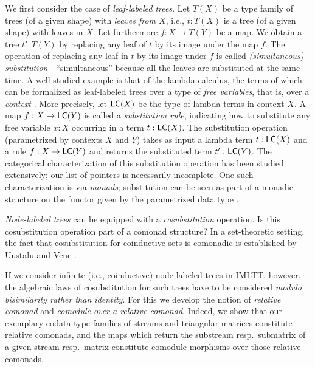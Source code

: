 \documentclass[a4paper,USenglish]{lipics}
\newcommand{\parencite}[1]{\cite{#1}}
\begin{document}
We first consider the  case of \emph{leaf-labeled trees}.
 Let $T(X)$ be a type family of trees (of a given shape) with \emph{leaves from $X$}, i.e., $t: T(X)$ is a tree (of a given shape) with leaves in $X$.
 Let furthermore $f : X \to T(Y)$ be a map. We obtain a tree $t' : T(Y)$ by replacing any leaf of $t$ by its image under the map $f$.
 The operation of replacing any leaf in $t$ by its image under $f$ is called \emph{(simultaneous) substitution}---\enquote{simultaneous} because all the leaves are 
 substituted at the same time. 
 A well-studied example is that of the lambda calculus, the terms of which can be formalized as leaf-labeled trees over a type of \emph{free variables}, that is,
 over a \emph{context} \parencite{alt_reus}.
 More precisely, let $\mathsf{LC}(X)$ be the type of lambda terms in context $X$. A map $f : X \to \mathsf{LC}(Y)$ is called a \emph{substitution rule}, indicating how to substitute any 
 free variable $x:X$ occurring in a term $t : \mathsf{LC}(X)$. 
 The substitution operation (parametrized by contexts $X$ and $Y$) takes as input a lambda term $t : \mathsf{LC}(X)$ and a rule $f : X \to \mathsf{LC}(Y)$ and returns the substituted term
 $t' : \mathsf{LC}(Y)$.
 The categorical characterization of this substitution operation
 has been studied extensively; our list of pointers \parencite{alt_reus, fpt, Power:2007:ASS:1230146.1230276, Tanaka:2005:UCF:1088454.1088457,
 DBLP:journals/iandc/HirschowitzM10, DBLP:conf/fossacs/AltenkirchCU10, ahrens_relmonads} is necessarily incomplete.
 One such characterization is via \emph{monads}; substitution can be seen as part of a monadic structure on the functor 
 given by the parametrized data type \parencite{alt_reus, 
 DBLP:journals/iandc/HirschowitzM10, DBLP:conf/fossacs/AltenkirchCU10, ahrens_relmonads}.
 
 
 \emph{Node-labeled trees} can be equipped with a \emph{cosubstitution} operation. 
 Is this cosubstitution operation part of a comonad structure?
 In a set-theoretic setting, the fact that cosubstitution for coinductive sets is comonadic is established by Uustalu and Vene \cite{DBLP:conf/sfp/UustaluV01}.
 
  
 If we consider infinite (i.e., coinductive) node-labeled trees in IMLTT, however, the algebraic laws of cosubstitution for such trees have to be considered 
 \emph{modulo bisimilarity rather than identity}.
 For this we develop the notion of \emph{relative comonad} and \emph{comodule over a relative comonad}.
 Indeed, we show that our exemplary codata type families of streams and triangular matrices constitute relative comonads, and the maps which 
 return the substream resp.\ submatrix of a given stream resp.\ matrix constitute comodule morphisms over those relative comonads.
 
\end{document}
